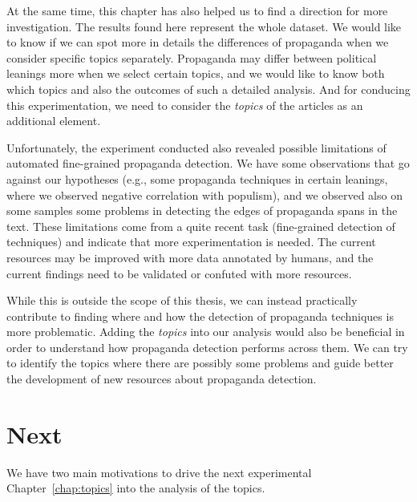 At the same time, this chapter has also helped us to find a direction for more investigation. The results found here represent the whole dataset. We would like to know if we can spot more in details the differences of propaganda when we consider specific topics separately. Propaganda may differ between political leanings more when we select certain topics, and we would like to know both which topics and also the outcomes of such a detailed analysis. And for conducing this experimentation, we need to consider the \emph{topics} of the articles as an additional element.

Unfortunately, the experiment conducted also revealed possible limitations of automated fine-grained propaganda detection.
We have some observations that go against our hypotheses (e.g., some propaganda techniques in certain leanings, where we observed negative correlation with populism), and we observed also on some samples some problems in detecting the edges of propaganda spans in the text.
These limitations come from a quite recent task (fine-grained detection of techniques) and indicate that more experimentation is needed. The current resources may be improved with more data annotated by humans, and the current findings need to be validated or confuted with more resources.

While this is outside the scope of this thesis, we can instead practically contribute to finding where and how the detection of propaganda techniques is more problematic.
Adding the \emph{topics} into our analysis would also be beneficial in order to understand how propaganda detection performs across them.
We can try to identify the topics where there are possibly some problems and guide better the development of new resources about propaganda detection.


\section{\statusgreen Next}
\label{sec:ps_next}

We have two main motivations to drive the next experimental Chapter~\ref{chap:topics} into the analysis of the topics.

